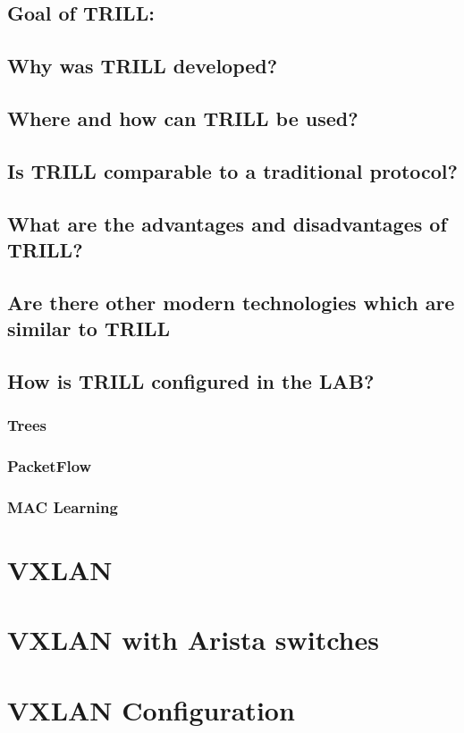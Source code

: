 \documentclass[a4,12pt]{scrartcl}
\begin{document}
\subsection{Goal of TRILL:}
\subsection{Why was TRILL developed?}
\subsection{Where and how can TRILL be used?}
\subsection{Is TRILL comparable to a traditional protocol?}
\subsection{What are the advantages and disadvantages of TRILL?}
\subsection{Are there other modern technologies which are similar to TRILL}
\subsection{How is TRILL configured in the LAB?}
\subsubsection{Trees}
\subsubsection{PacketFlow}
\subsubsection{MAC Learning}
\section{VXLAN}
\section{VXLAN with Arista switches}
\section{VXLAN Configuration}
\end{document}
